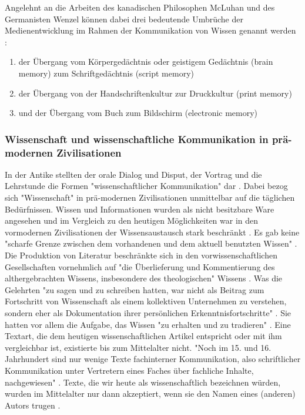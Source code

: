 Angelehnt an die Arbeiten des kanadischen Philosophen McLuhan und des Germanisten Wenzel können dabei drei bedeutende Umbrüche der Medienentwicklung im Rahmen der Kommunikation von Wissen genannt werden \cite{Wunderlich_2008} \cite{Wenzel_2007}:
\begin{enumerate}
\item der Übergang vom Körpergedächtnis oder geistigem Gedächtnis (brain memory) zum Schriftgedächtnis (script memory)
\item der Übergang von der Handschriftenkultur zur Druckkultur (print memory)
\item und der Übergang vom Buch zum Bildschirm (electronic memory)
\end{enumerate}

\subsubsection{Wissenschaft und wissenschaftliche Kommunikation in prä-modernen Zivilisationen}

In der Antike stellten der orale Dialog und Disput, der Vortrag und die Lehrstunde die Formen "wissenschaftlicher Kommunikation" dar \cite{Hollricher_2009}. Dabei bezog sich "Wissenschaft" in prä-modernen Zivilisationen unmittelbar auf die täglichen Bedürfnissen. Wissen und Informationen wurden als nicht besitzbare Ware angesehen \cite{May_2006} \cite{Steiner_1998} und im Vergleich zu den heutigen Möglichkeiten war in den vormodernen Zivilisationen der Wissensaustausch stark beschränkt \cite{Hollricher_2009}. Es gab keine "scharfe Grenze zwischen dem vorhandenen und dem aktuell benutzten Wissen" \cite[:161]{Luhmann_1998}. Die Produktion von Literatur beschränkte sich in den vorwissenschaftlichen Gesellschaften vornehmlich auf "die Überlieferung und Kommentierung des althergebrachten Wissens, insbesondere des theologischen" Wissens \cite{Steiner_1998}. Was die Gelehrten "zu sagen und zu schreiben hatten, war nicht als Beitrag zum Fortschritt von Wissenschaft als einem kollektiven Unternehmen zu verstehen, sondern eher als Dokumentation ihrer persönlichen Erkenntnisfortschritte" \cite[:51]{Graefen_2007}. Sie hatten vor allem die Aufgabe, das Wissen "zu erhalten und zu tradieren" \cite[:148]{Luhmann_1998}. Eine Textart, die dem heutigen wissenschaftlichen Artikel entspricht oder mit ihm vergleichbar ist, existierte bis zum Mittelalter nicht. "Noch im 15. und 16. Jahrhundert sind nur wenige Texte fachinterner Kommunikation, also schriftlicher Kommunikation unter Vertretern eines Faches über fachliche Inhalte, nachgewiesen" \cite[:51]{Graefen_2007}. Texte, die wir heute als wissenschaftlich bezeichnen würden, wurden im Mittelalter nur dann akzeptiert, wenn sie den Namen eines (anderen) Autors trugen \cite{Foucault_2000}.

